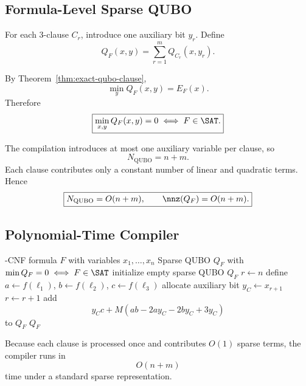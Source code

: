 \subsection{Formula-Level Sparse QUBO}

For each 3-clause $C_r$, introduce one auxiliary bit $y_r$. Define
\begin{equation}
Q_F(x,y)
=
\sum_{r=1}^{m}
Q_{C_r}(x,y_r).
\end{equation}

By Theorem~\ref{thm:exact-qubo-clause},
\begin{equation}
\min_y Q_F(x,y)
=
E_F(x).
\end{equation}
Therefore
\begin{equation}
\boxed{
\min_{x,y}Q_F(x,y)=0
\iff
F\in\SAT.
}
\end{equation}

The compilation introduces at most one auxiliary variable per clause, so
\begin{equation}
N_{\mathrm{QUBO}}
=
n+m.
\end{equation}
Each clause contributes only a constant number of linear and quadratic terms.
Hence
\begin{equation}
\boxed{
N_{\mathrm{QUBO}}=O(n+m),
\qquad
\nnz(Q_F)=O(n+m).
}
\end{equation}

\subsection{Polynomial-Time Compiler}

\begin{algorithm}[t]
\caption{\textsc{Compile3SATToExactQUBO}}
\label{alg:compile-exact-qubo}
\begin{algorithmic}[1]
-CNF formula $F$ with variables $x_1,\ldots,x_n$
\Ensure Sparse QUBO $Q_F$ with $\min Q_F=0\iff F\in\SAT$
\State initialize empty sparse QUBO $Q_F$
\State $r\gets n$
    \State define $a\gets f(\ell_1)$, $b\gets f(\ell_2)$, $c\gets f(\ell_3)$
    \State allocate auxiliary bit $y_C\gets x_{r+1}$
    \State $r\gets r+1$
    \State add
    \[
    y_Cc+M(ab-2ay_C-2by_C+3y_C)
    \]
    to $Q_F$
\EndFor
\State \Return $Q_F$
\end{algorithmic}
\end{algorithm}

Because each clause is processed once and contributes $O(1)$ sparse terms, the
compiler runs in
\begin{equation}
O(n+m)
\end{equation}
time under a standard sparse representation.

